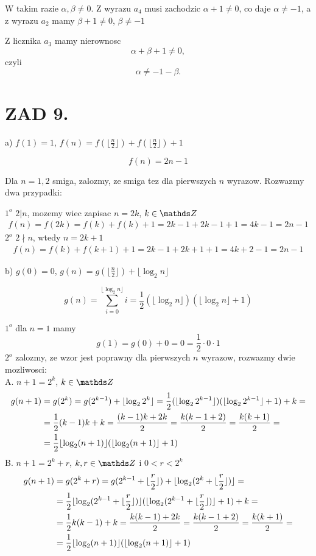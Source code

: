 \documentclass{article}[13pt]
\begin{document}
    W takim razie $\alpha,\beta\neq0$. Z wyrazu $a_4$ musi zachodzic $\alpha+1\neq0$, co daje $\alpha\neq -1$, a z wyrazu $a_2$ mamy $\beta+1\neq0$, $\beta\neq-1$
    \medskip

    Z licznika $a_3$ mamy nierownosc
    $$\alpha+\beta+1\neq0,$$
    czyli
    $$\alpha\neq-1-\beta.$$

    \section*{ZAD 9.}

    a) $f(1)=1$, $f(n)=f(\lfloor\frac n2\rfloor)+f(\lfloor\frac n2\rfloor)+1$

    $$f(n)=2n-1$$

    Dla $n=1,2$ smiga, zalozmy, ze smiga tez dla pierwszych $n$ wyrazow. Rozwazmy dwa przypadki:
    
    \indent $1^o$ $2|n$, mozemy wiec zapisac $n=2k$, $k\in\Z$
    \begin{align*}
        f(n)=f(2k)=f(k)+f(k)+1=2k-1+2k-1+1=4k-1=2n-1
    \end{align*}
    \indent $2^o$ $2\nmid n$, wtedy $n=2k+1$
    \begin{align*}
        f(n)=f(k)+f(k+1)+1=2k-1+2k+1+1=4k+2-1=2n-1
    \end{align*}
    \medskip

    b) $g(0)=0$, $g(n)=g(\lfloor\frac n2\rfloor)+\lfloor\log_2n\rfloor$

    $$g(n)=\sum\limits_{i=0}^{\lfloor \log_2n\rfloor}i=\frac12(\lfloor\log_2n\rfloor)(\lfloor\log_2n\rfloor+1)$$

    \indent $1^o$ dla $n=1$ mamy
    $$g(1)=g(0)+0=0=\frac12\cdot0\cdot 1$$
    \indent $2^o$ zalozmy, ze wzor jest poprawny dla pierwszych $n$ wyrazow, rozwazmy dwie mozliwosci:\smallskip\\
    A. $n+1=2^k$, $k\in\Z$
    \begin{align*}
        g(n+1)&=g(2^k)=g(2^{k-1})+\lfloor\log_22^k\rfloor=\frac12(\lfloor\log_22^{k-1}\rfloor)(\lfloor\log_22^{k-1}\rfloor+1)+k=\\
        &=\frac12(k-1)k+k={(k-1)k+2k\over 2}={k(k-1+2)\over2}={k(k+1)\over2}=\\
        &=\frac12\lfloor\log_2(n+1)\rfloor(\lfloor\log_2(n+1)\rfloor+1)
    \end{align*}
    B. $n+1=2^k+r$, $k,r\in\Z$ i $0<r<2^k$
    \begin{align*}
        g(n+1)&=g(2^k+r)=g(2^{k-1}+\lfloor{\frac r2}\rfloor)+\lfloor\log_2(2^k+\lfloor{\frac r2}\rfloor)\rfloor=\\
        &=\frac12\lfloor\log_2(2^{k-1}+\lfloor{\frac r2}\rfloor)\rfloor(\lfloor\log_2(2^{k-1}+\lfloor{\frac r2}\rfloor)\rfloor+1)+k=\\
        &=\frac12k(k-1)+k={k(k-1)+2k\over2}={k(k-1+2)\over2}={k(k+1)\over 2}=\\
        &=\frac12\lfloor\log_2(n+1)\rfloor(\lfloor\log_2(n+1)\rfloor+1)
    \end{align*}
\end{document}
